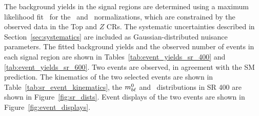 The background yields in the signal regions are determined using a maximum
likelihood fit~\cite{Baak:2014wma} for the \TTBAR\ and
\ZGAMMAJETS\ normalizations, which are constrained by the observed data in the
Top and $Z$ CRs.
The systematic uncertainties described in Section~\ref{sec:systematics} are
included as Gaussian-distributed nuisance parameters.
The fitted background yields and the observed number of events in each
signal region are shown in Tables~\ref{tab:event_yields_sr_400} and
\ref{tab:event_yields_sr_600}.
Two events are observed, in agreement with the SM prediction.
The kinematics of the two selected events are shown in
Table~\ref{tab:sr_event_kinematics}, the $m_{b\ell}^0$ and \HT\ distributions in
SR 400 are shown in Figure~\ref{fig:sr_dists}.
Event displays of the two events are shown in Figure~\ref{fig:event_displays}.

